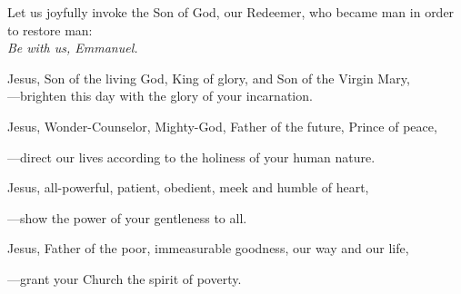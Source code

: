 \intercessions\indent

\begin{hangpar}

Let us joyfully invoke the Son of God, our Redeemer, who became man in order to restore man:\\
\emph{Be with us, Emmanuel.}

\medskip Jesus, Son of the living God, King of glory, and Son of the Virgin Mary,\\

{\color{red}---\thinspace}brighten this day with the glory of your incarnation.

\medskip Jesus, Wonder-Counselor, Mighty-God, Father of the future, Prince of peace,

{\color{red}---\thinspace}direct our lives according to the holiness of your human nature.

\medskip Jesus, all-powerful, patient, obedient, meek and humble of heart,

{\color{red}---\thinspace}show the power of your gentleness to all.

\medskip Jesus, Father of the poor, immeasurable goodness, our way and our life,

{\color{red}---\thinspace}grant your Church the spirit of poverty.

\medskip

\end{hangpar}
